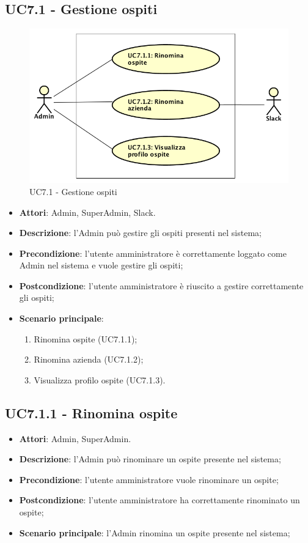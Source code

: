 \documentclass[../AnalisiDeiRequisiti_v4.0.0.tex]{subfiles}
\begin{document}
\subsection{UC7.1 - Gestione ospiti} 
\label{sssec:UC7.1} 
\begin{figure}[!h]
	\centering
	\includegraphics[width=\textwidth]{UseCases/UC7_GestionePannelloAdmin/UC7_1_GestioneOspiti/UC7_1_GestioneOspiti.png}
	\caption{UC7.1 - Gestione ospiti}
\end{figure}
\begin{itemize} 
\item \textbf{Attori}: Admin, SuperAdmin, Slack.
\item \textbf{Descrizione}: l'Admin può gestire gli ospiti presenti nel sistema;
\item \textbf{Precondizione}: l'utente amministratore è correttamente loggato come Admin nel sistema e vuole gestire gli ospiti;
\item \textbf{Postcondizione}: l'utente amministratore è riuscito a gestire correttamente gli ospiti;
\item \textbf{Scenario principale}: \begin{enumerate}\item Rinomina ospite (UC7.1.1);\item Rinomina azienda (UC7.1.2);\item Visualizza profilo ospite (UC7.1.3). 
 \end{enumerate}
\end{itemize} 
\subsection{UC7.1.1 - Rinomina ospite} 
\label{sssec:UC7.1.1} 
\begin{itemize} 
\item \textbf{Attori}: Admin, SuperAdmin.
\item \textbf{Descrizione}: l'Admin può rinominare un ospite presente nel sistema;
\item \textbf{Precondizione}: l'utente amministratore vuole rinominare un ospite;
\item \textbf{Postcondizione}: l'utente amministratore ha correttamente rinominato un ospite;
\item \textbf{Scenario principale}: l'Admin rinomina un ospite presente nel sistema;
\end{itemize} 
\end{document}
